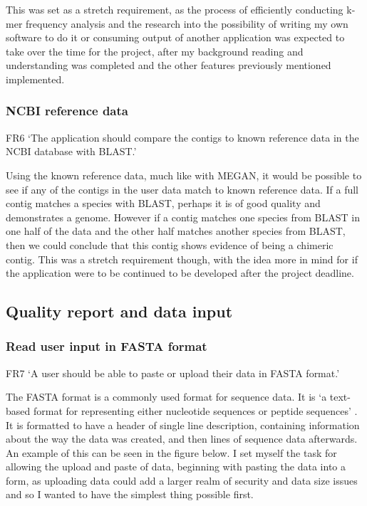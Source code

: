 This was set as a stretch requirement, as the process of efficiently conducting k-mer frequency analysis and the research into the possibility of writing my own software to do it or consuming output of another application was expected to take over the time for the project, after my background reading and understanding was completed and the other features previously mentioned implemented.

\subsubsection{NCBI reference data}
FR6 `The application should compare the contigs to known reference data in the NCBI database with BLAST.'

Using the known reference data, much like with MEGAN, it would be possible to see if any of the contigs in the user data match to known reference data. If a full contig matches a species with BLAST, perhaps it is of good quality and demonstrates a genome. However if a contig matches one species from BLAST in one half of the data and the other half matches another species from BLAST, then we could conclude that this contig shows evidence of being a chimeric contig. This was a stretch requirement though, with the idea more in mind for if the application were to be continued to be developed after the project deadline.

\subsection{Quality report and data input}
\subsubsection{Read user input in FASTA format}
FR7 `A user should be able to paste or upload their data in FASTA format.'

The FASTA format is a commonly used format for sequence data. It is `a text-based format for representing either nucleotide sequences or peptide sequences' \cite{fastaformat}. It is formatted to have a header of single line description, containing information about the way the data was created, and then lines of sequence data afterwards. An example of this can be seen in the figure below. I set myself the task for allowing the upload and paste of data, beginning with pasting the data into a form, as uploading data could add a larger realm of security and data size issues and so I wanted to have the simplest thing possible first.


